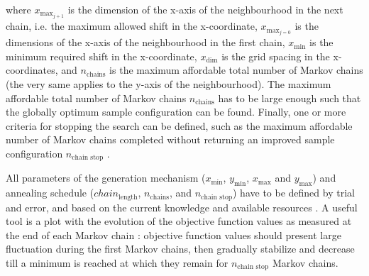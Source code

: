 \noindent where $x_{\text{max}_{j + 1}}$ is the dimension of the x-axis of the neighbourhood in the next chain,
i.e. the maximum allowed shift in the x-coordinate, $x_{\text{max}_{j = 0}}$ is the dimensions of the x-axis
of the neighbourhood in the first chain, $x_\text{min}$ is the minimum required shift in the x-coordinate, 
$x_\text{dim}$ is the grid spacing in the x-coordinates, and $n_\text{chains}$ is the maximum affordable total 
number of Markov chains (the very same applies to the y-axis of the neighbourhood). The maximum affordable 
total number of Markov chains $n_\text{chains}$ has to be large enough such that the globally optimum sample 
configuration can be found. Finally, one or more criteria for stopping the search can be defined, such as the 
maximum affordable number of Markov chains completed without returning an improved sample configuration 
$n_\text{chain stop}$ \cite{Groenigen1999a}.




All parameters of the generation mechanism ($x_\text{min}$, $y_\text{min}$, $x_\text{max}$ and $y_\text{max}$) 
and annealing schedule ($chain_\text{length}$, $n_\text{chains}$, and $n_\text{chain stop}$) have to be defined 
by trial and error, and based on the current knowledge and available resources \cite{WebsterEtAl2013}. A useful 
tool is a plot with the evolution of the objective function values as measured at the end of each Markov chain 
\cite{LarkEtAl2003}: objective function values should present large fluctuation during the first Markov chains, 
then gradually stabilize and decrease till a minimum is reached at which they remain for $n_\text{chain 
stop}$ Markov chains.

